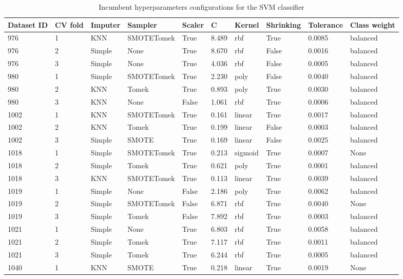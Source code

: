 \documentclass[11pt]{article}
\begin{document}
\begin{table}
\footnotesize
\caption{Incumbent hyperparameters configurations for the SVM classifier}
\center
\begin{tabular}{llllllllll}
\toprule
Dataset ID & CV fold & Imputer & Sampler & Scaler & C & Kernel & Shrinking & Tolerance & Class weight \\
\midrule
976 & 1 & KNN & SMOTETomek & True & 8.489 & rbf & True & 0.0085 & balanced \\
976 & 2 & Simple & None & True & 8.670 & rbf & False & 0.0016 & balanced \\
976 & 3 & Simple & None & True & 4.036 & rbf & False & 0.0005 & balanced \\
\midrule
980 & 1 & Simple & SMOTETomek & True & 2.230 & poly & False & 0.0040 & balanced \\
980 & 2 & KNN & Tomek & True & 0.893 & poly & True & 0.0030 & balanced \\
980 & 3 & KNN & None & False & 1.061 & rbf & True & 0.0006 & balanced \\
\midrule
1002 & 1 & KNN & SMOTETomek & True & 0.161 & linear & True & 0.0017 & balanced \\
1002 & 2 & KNN & Tomek & True & 0.199 & linear & False & 0.0003 & balanced \\
1002 & 3 & Simple & SMOTE & True & 0.169 & linear & False & 0.0025 & balanced \\
\midrule
1018 & 1 & Simple & SMOTETomek & True & 0.213 & sigmoid & True & 0.0007 & None \\
1018 & 2 & Simple & Tomek & True & 0.621 & poly & True & 0.0001 & balanced \\
1018 & 3 & KNN & SMOTETomek & True & 0.113 & linear & True & 0.0039 & balanced \\
\midrule
1019 & 1 & Simple & None & False & 2.186 & poly & True & 0.0062 & balanced \\
1019 & 2 & Simple & SMOTETomek & False & 6.871 & rbf & True & 0.0040 & None \\
1019 & 3 & Simple & Tomek & False & 7.892 & rbf & True & 0.0003 & balanced \\
\midrule
1021 & 1 & Simple & None & True & 6.803 & rbf & True & 0.0058 & balanced \\
1021 & 2 & Simple & Tomek & True & 7.117 & rbf & True & 0.0011 & balanced \\
1021 & 3 & Simple & Tomek & True & 6.244 & rbf & True & 0.0005 & balanced \\
\midrule
1040 & 1 & KNN & SMOTE & True & 0.218 & linear & True & 0.0019 & None \\

\end{tabular}
\end{table}
\end{document}
